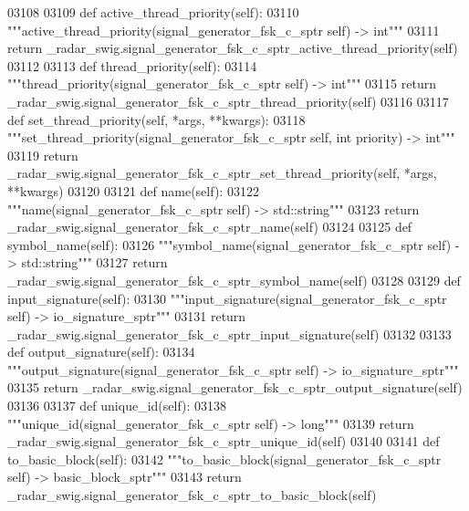 \begin{DoxyCode}
{{{{{{{{{{{03108 
03109     \textcolor{keyword}{def }active_thread_priority(self):
03110         \textcolor{stringliteral}{"""active\_thread\_priority(signal\_generator\_fsk\_c\_sptr self) -> int"""}
03111         \textcolor{keywordflow}{return} \_radar\_swig.signal\_generator\_fsk\_c\_sptr\_active\_thread\_priority(self)
03112 
03113     \textcolor{keyword}{def }thread_priority(self):
03114         \textcolor{stringliteral}{"""thread\_priority(signal\_generator\_fsk\_c\_sptr self) -> int"""}
03115         \textcolor{keywordflow}{return} \_radar\_swig.signal\_generator\_fsk\_c\_sptr\_thread\_priority(self)
03116 
03117     \textcolor{keyword}{def }set_thread_priority(self, *args, **kwargs):
03118         \textcolor{stringliteral}{"""set\_thread\_priority(signal\_generator\_fsk\_c\_sptr self, int priority) -> int"""}
03119         \textcolor{keywordflow}{return} \_radar\_swig.signal\_generator\_fsk\_c\_sptr\_set\_thread\_priority(self, *args, **kwargs)
03120 
03121     \textcolor{keyword}{def }name(self):
03122         \textcolor{stringliteral}{"""name(signal\_generator\_fsk\_c\_sptr self) -> std::string"""}
03123         \textcolor{keywordflow}{return} \_radar\_swig.signal\_generator\_fsk\_c\_sptr\_name(self)
03124 
03125     \textcolor{keyword}{def }symbol_name(self):
03126         \textcolor{stringliteral}{"""symbol\_name(signal\_generator\_fsk\_c\_sptr self) -> std::string"""}
03127         \textcolor{keywordflow}{return} \_radar\_swig.signal\_generator\_fsk\_c\_sptr\_symbol\_name(self)
03128 
03129     \textcolor{keyword}{def }input_signature(self):
03130         \textcolor{stringliteral}{"""input\_signature(signal\_generator\_fsk\_c\_sptr self) -> io\_signature\_sptr"""}
03131         \textcolor{keywordflow}{return} \_radar\_swig.signal\_generator\_fsk\_c\_sptr\_input\_signature(self)
03132 
03133     \textcolor{keyword}{def }output_signature(self):
03134         \textcolor{stringliteral}{"""output\_signature(signal\_generator\_fsk\_c\_sptr self) -> io\_signature\_sptr"""}
03135         \textcolor{keywordflow}{return} \_radar\_swig.signal\_generator\_fsk\_c\_sptr\_output\_signature(self)
03136 
03137     \textcolor{keyword}{def }unique_id(self):
03138         \textcolor{stringliteral}{"""unique\_id(signal\_generator\_fsk\_c\_sptr self) -> long"""}
03139         \textcolor{keywordflow}{return} \_radar\_swig.signal\_generator\_fsk\_c\_sptr\_unique\_id(self)
03140 
03141     \textcolor{keyword}{def }to_basic_block(self):
03142         \textcolor{stringliteral}{"""to\_basic\_block(signal\_generator\_fsk\_c\_sptr self) -> basic\_block\_sptr"""}
03143         \textcolor{keywordflow}{return} \_radar\_swig.signal\_generator\_fsk\_c\_sptr\_to\_basic\_block(self)
}}}}}}}}}}}
\end{DoxyCode}

